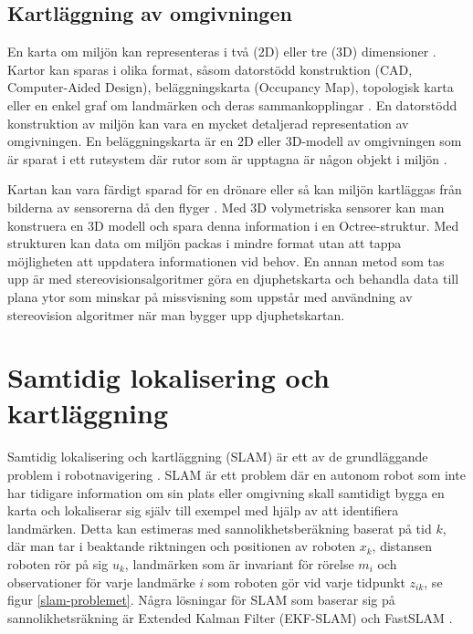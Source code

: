 \section{Kartläggning av omgivningen}

En karta om miljön kan representeras i två (2D) eller tre (3D) dimensioner \citep{geospatial}. Kartor kan sparas i olika format, såsom datorstödd konstruktion (CAD, Computer-Aided Design), beläggningskarta (Occupancy Map), topologisk karta eller en enkel graf om landmärken och deras sammankopplingar \citep{982903}. En datorstödd konstruktion av miljön kan vara en mycket detaljerad representation av omgivningen. En beläggningskarta är en 2D eller 3D-modell av omgivningen som är sparat i ett rutsystem där rutor som är upptagna är någon objekt i miljön \citep{6095058, 982903}. 

Kartan kan vara färdigt sparad för en drönare eller så kan miljön kartläggas från bilderna av sensorerna då den flyger \citep{geospatial}. Med 3D volymetriska sensorer kan man konstruera en 3D modell och spara denna information i en Octree-struktur. Med strukturen kan data om miljön packas i mindre format utan att tappa möjligheten att uppdatera informationen vid behov. En annan metod som tas upp är med stereovisionsalgoritmer göra en djuphetskarta och behandla data till plana ytor som minskar på missvisning som uppstår med användning av stereovision algoritmer när man bygger upp djuphetskartan.

\chapter{Samtidig lokalisering och kartläggning}

Samtidig lokalisering och kartläggning (SLAM) är ett av de grundläggande problem i robotnavigering \citep{realslamproblem}. SLAM är ett problem där en autonom robot som inte har tidigare information om sin plats eller omgivning skall samtidigt bygga en karta och lokaliserar sig själv till exempel med hjälp av att identifiera landmärken. Detta kan estimeras med sannolikhetsberäkning baserat på tid $k$, där man tar i beaktande riktningen och positionen av roboten $x_k$, distansen roboten rör på sig $u_k$, landmärken som är invariant för rörelse $m_i$ och observationer för varje landmärke $i$ som roboten gör vid varje tidpunkt $z_{ik}$, se figur \ref{slam-problemet}. Några lösningar för SLAM som baserar sig på sannolikhetsräkning är Extended Kalman Filter (EKF-SLAM) och FastSLAM \citep{realslamproblem}. 


